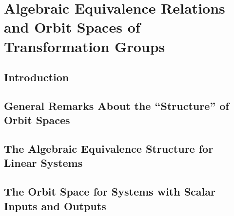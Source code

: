 \documentclass[12pt]{book}
\theoremstyle{plain}
\theoremstyle{definition}
\begin{document}
\chapter{Algebraic Equivalence Relations and Orbit Spaces of Transformation Groups}

\section{Introduction}

\section{General Remarks About the ``Structure'' of Orbit Spaces}

\section{The Algebraic Equivalence Structure for Linear Systems}

\section{The Orbit Space for Systems with Scalar Inputs and Outputs}

\end{document}
